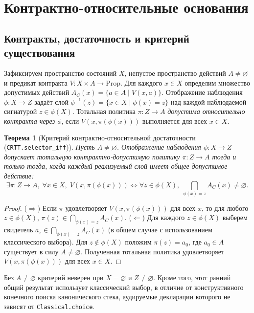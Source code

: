 \documentclass[10pt,a4paper]{article}
\newtheorem{theorem}{Теорема}[section]
\begin{document}
\section{Контрактно-относительные основания}
\label{sec:foundations}
\subsection{Контракты, достаточность и критерий существования}
Зафиксируем пространство состояний $X$, непустое пространство действий $A \neq \varnothing$ и предикат контракта $V : X \times A \to \mathrm{Prop}$. Для каждого $x \in X$ определим множество допустимых действий $A_C(x) = \{ a \in A \mid V(x, a) \}$. Отображение наблюдения $\phi : X \to Z$ задаёт слой $\phi^{-1}(z) = \{ x \in X \mid \phi(x) = z \}$ над каждой наблюдаемой сигнатурой $z \in \phi(X)$. Тотальная политика $\pi : Z \to A$ \emph{допустима относительно контракта через $\phi$}, если $V(x, \pi(\phi(x)))$ выполняется для всех $x \in X$.

\begin{theorem}[Критерий контрактно-относительной достаточности (\texttt{CRTT.selector\_iff})]
\label{thm:sufficiency}
Пусть $A \neq \varnothing$. Отображение наблюдения $\phi : X \to Z$ допускает тотальную контрактно-допустимую политику $\pi : Z \to A$ тогда и только тогда, когда каждый реализуемый слой имеет общее допустимое действие:
\begin{equation}
\label{eq:sufficiency}
\exists \pi : Z \to A,\; \forall x \in X,\; V(x, \pi(\phi(x)))
\iff
\forall z \in \phi(X),\; \bigcap_{\phi(x) = z} A_C(x) \neq \varnothing.
\end{equation}
\end{theorem}
\begin{proof}
($\Rightarrow$) Если $\pi$ удовлетворяет $V(x, \pi(\phi(x)))$ для всех $x$, то для любого $z \in \phi(X)$, $\pi(z) \in \bigcap_{\phi(x)=z} A_C(x)$.
($\Leftarrow$) Для каждого $z \in \phi(X)$ выберем свидетель $a_z \in \bigcap_{\phi(x)=z} A_C(x)$ (в общем случае с использованием классического выбора). Для $z \notin \phi(X)$ положим $\pi(z) = a_0$, где $a_0 \in A$ существует в силу $A \neq \varnothing$. Полученная тотальная политика удовлетворяет $V(x, \pi(\phi(x)))$ для всех $x \in X$.
\end{proof}
Без $A \neq \varnothing$ критерий неверен при $X = \varnothing$ и $Z \neq \varnothing$. Кроме того, этот ранний общий результат использует классический выбор, в отличие от конструктивного конечного поиска канонического стека, аудируемые декларации которого не зависят от \texttt{Classical.choice}.
\end{document}

